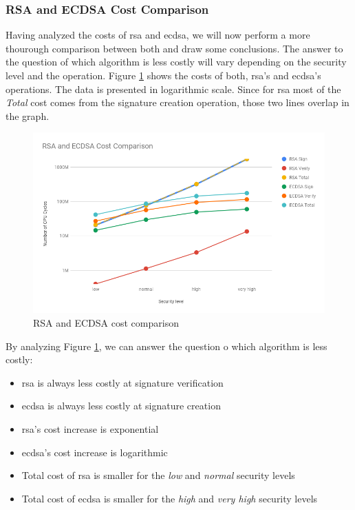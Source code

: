 \subsubsection{RSA and ECDSA Cost Comparison} \label{sec:rsa-vs-ecdsa}

Having analyzed the costs of \gls{rsa} and \gls{ecdsa}, we will now perform a more thourough comparison between both and draw some conclusions. 
The answer to the
question of which algorithm is less costly will vary depending on the security level and the operation. Figure \ref{fig:ecdsa-rsa-costs-all}
shows the costs of both, \gls{rsa}'s and \gls{ecdsa}'s operations. The data is presented in logarithmic scale. Since for \gls{rsa} most
of the \textit{Total} cost comes from the signature creation operation, those two lines overlap in the graph.

\begin{figure}
  \centering
  \includegraphics[width=1.0\textwidth]{img/rsa_ecdsa_costs_all_2.png}
  \centering \caption{\label{fig:ecdsa-rsa-costs-all} RSA and ECDSA cost comparison}
\end{figure}

By analyzing Figure \ref{fig:ecdsa-rsa-costs-all}, we can answer the question o which algorithm is less costly:

\begin{itemize}
  \item \gls{rsa} is always less costly at signature verification
  \item \gls{ecdsa} is always less costly at signature creation
  \item \gls{rsa}'s cost increase is exponential
  \item \gls{ecdsa}'s cost increase is logarithmic
  \item Total cost of \gls{rsa} is smaller for the \textit{low} and \textit{normal} security levels
  \item Total cost of \gls{ecdsa} is smaller for the \textit{high} and \textit{very high} security levels
\end{itemize}



